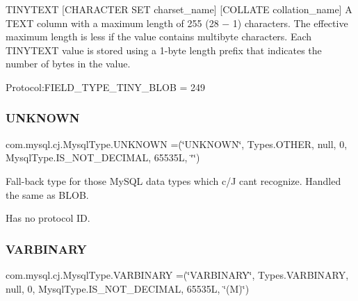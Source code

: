T\+I\+N\+Y\+T\+E\+XT \mbox{[}C\+H\+A\+R\+A\+C\+T\+ER S\+ET charset\+\_\+name\mbox{]} \mbox{[}C\+O\+L\+L\+A\+TE collation\+\_\+name\mbox{]} A T\+E\+XT column with a maximum length of 255 (28 − 1) characters. The effective maximum length is less if the value contains multibyte characters. Each T\+I\+N\+Y\+T\+E\+XT value is stored using a 1-\/byte length prefix that indicates the number of bytes in the value.

Protocol\+:F\+I\+E\+L\+D\+\_\+\+T\+Y\+P\+E\+\_\+\+T\+I\+N\+Y\+\_\+\+B\+L\+OB = 249 \mbox{\label{enumcom_1_1mysql_1_1cj_1_1_mysql_type_a5c1f5a756ee4ef0468c1782e0f2bec65}} 
\subsubsection{\texorpdfstring{U\+N\+K\+N\+O\+WN}{UNKNOWN}}
{\footnotesize\ttfamily com.\+mysql.\+cj.\+Mysql\+Type.\+U\+N\+K\+N\+O\+WN =(\char`\"{}U\+N\+K\+N\+O\+WN\char`\"{}, Types.\+O\+T\+H\+ER, null, 0, Mysql\+Type.\+I\+S\+\_\+\+N\+O\+T\+\_\+\+D\+E\+C\+I\+M\+AL, 65535\+L, \char`\"{}\char`\"{})}

Fall-\/back type for those My\+S\+QL data types which c/J can\textquotesingle{}t recognize. Handled the same as B\+L\+OB.

Has no protocol ID. \mbox{\label{enumcom_1_1mysql_1_1cj_1_1_mysql_type_a8178476164112332f2b676c85c208baa}} 
\subsubsection{\texorpdfstring{V\+A\+R\+B\+I\+N\+A\+RY}{VARBINARY}}
{\footnotesize\ttfamily com.\+mysql.\+cj.\+Mysql\+Type.\+V\+A\+R\+B\+I\+N\+A\+RY =(\char`\"{}V\+A\+R\+B\+I\+N\+A\+RY\char`\"{}, Types.\+V\+A\+R\+B\+I\+N\+A\+RY, null, 0, Mysql\+Type.\+I\+S\+\_\+\+N\+O\+T\+\_\+\+D\+E\+C\+I\+M\+AL, 65535\+L, \char`\"{}(\+M)\char`\"{})}

